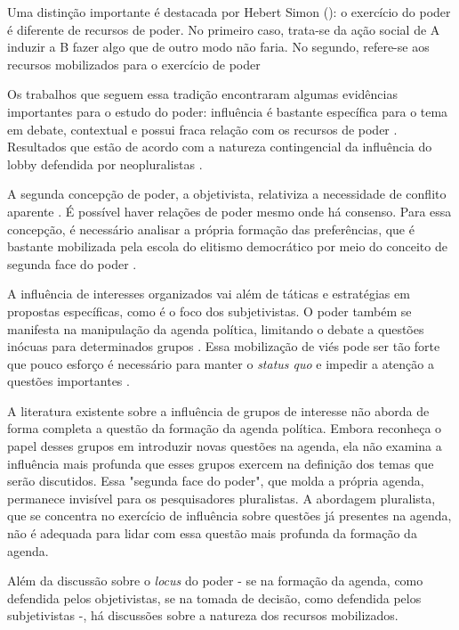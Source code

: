     Uma distinção importante é destacada por Hebert Simon (\citeyear{simon_notes_1953}): o exercício do poder é diferente de recursos de poder. No primeiro caso, trata-se da ação social de A induzir a B fazer algo que de outro modo não faria. No segundo, refere-se aos recursos mobilizados para o exercício de poder \cite{clarkterry1968community}
    
    Os trabalhos que seguem essa tradição encontraram algumas evidências importantes para o estudo do poder: influência é bastante específica para o tema em debate, contextual e possui fraca relação com os recursos de poder \cite{lowery_lobbying_2013}. Resultados que estão de acordo com a natureza contingencial da influência do lobby defendida por neopluralistas \cite{mcfarland2004neopluralism}.

A segunda concepção de poder, a objetivista, relativiza a necessidade de conflito aparente \cite{perissinoto2008}. É possível haver relações de poder mesmo onde há consenso. Para essa concepção, é necessário analisar a própria formação das preferências, que é bastante mobilizada pela escola do elitismo democrático \cite{bachrach1967theory} por meio do conceito de segunda face do poder \cite{bachrach1962two}.

    A influência de interesses organizados vai além de táticas e estratégias em propostas específicas, como é o foco dos subjetivistas. O poder também se manifesta na manipulação da agenda política, limitando o debate a questões inócuas para determinados grupos  \cite{bachrach1962two}. Essa mobilização de viés pode ser tão forte que pouco esforço é necessário para manter o \textit{status quo} e impedir a atenção a questões importantes \cite{schattschneider1975semisovereign}.
    
    A literatura existente sobre a influência de grupos de interesse não aborda de forma completa a questão da formação da agenda política. Embora reconheça o papel desses grupos em introduzir novas questões na agenda, ela não examina a influência mais profunda que esses grupos exercem na definição dos temas que serão discutidos. Essa "segunda face do poder", que molda a própria agenda, permanece invisível para os pesquisadores pluralistas. A abordagem pluralista, que se concentra no exercício de influência sobre questões já presentes na agenda, não é adequada para lidar com essa questão mais profunda da formação da agenda.

Além da discussão sobre o \textit{locus} do poder - se na formação da agenda, como defendida pelos objetivistas, se na tomada de decisão, como defendida pelos subjetivistas -, há discussões sobre a natureza dos recursos mobilizados.

